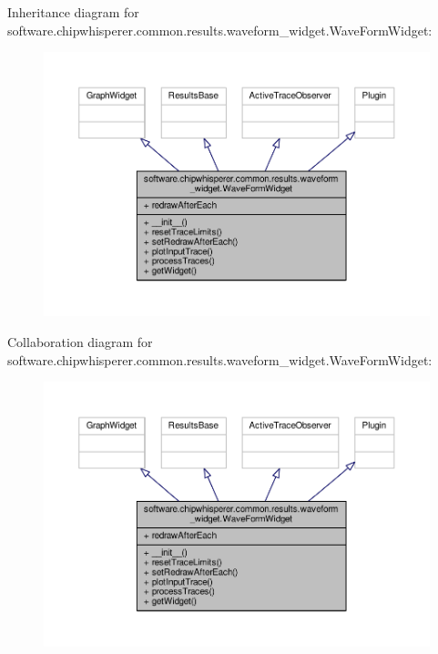Inheritance diagram for software.\+chipwhisperer.\+common.\+results.\+waveform\+\_\+widget.\+Wave\+Form\+Widget\+:\nopagebreak
\begin{figure}[H]
\begin{center}
\leavevmode
\includegraphics[width=350pt]{d0/d46/classsoftware_1_1chipwhisperer_1_1common_1_1results_1_1waveform__widget_1_1WaveFormWidget__inherit__graph}
\end{center}
\end{figure}


Collaboration diagram for software.\+chipwhisperer.\+common.\+results.\+waveform\+\_\+widget.\+Wave\+Form\+Widget\+:\nopagebreak
\begin{figure}[H]
\begin{center}
\leavevmode
\includegraphics[width=350pt]{d6/d60/classsoftware_1_1chipwhisperer_1_1common_1_1results_1_1waveform__widget_1_1WaveFormWidget__coll__graph}
\end{center}
\end{figure}


